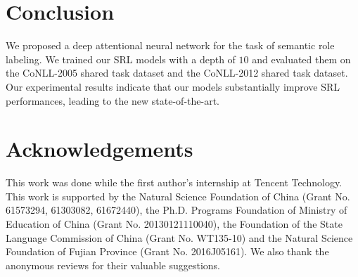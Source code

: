 \documentclass[letterpaper]{article} \usepackage{aaai18}  \usepackage{times}  \usepackage{helvet}  \usepackage{courier}  \usepackage{url}  \usepackage{graphicx}  \frenchspacing  \setlength{\pdfpagewidth}{8.5in}  \setlength{\pdfpageheight}{11in}  \usepackage{latexsym}
\begin{document}
\section{Conclusion}
We proposed a deep attentional neural network for the task of semantic role labeling. We trained our SRL models with a depth of $10$ and evaluated them on the CoNLL-2005 shared task dataset and the CoNLL-2012 shared task dataset. Our experimental results indicate that our models substantially improve SRL performances, leading to the new state-of-the-art.


\section*{Acknowledgements}
This work was done while the first author's internship at Tencent Technology. This work is supported by the Natural Science Foundation of China (Grant No. 61573294, 61303082, 61672440), the Ph.D. Programs Foundation of Ministry of Education of China (Grant No. 20130121110040), the Foundation of the State Language Commission of China (Grant No. WT135-10) and the Natural Science Foundation of Fujian Province (Grant No. 2016J05161). We also thank the anonymous reviews for their valuable suggestions.




\end{document}
